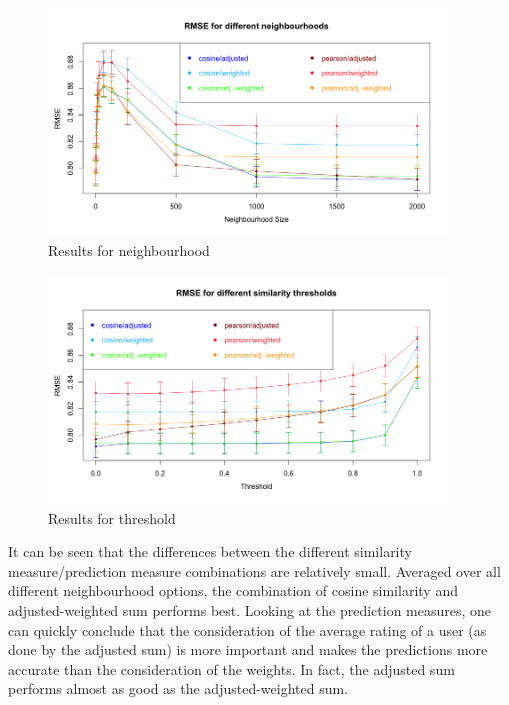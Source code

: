 \begin{figure}[!ht]
\centering
\includegraphics[width=400px]{./4-experiments/figures/USERBASED_N_V4.png}
\caption{Results for neighbourhood}
\label{f:userbasedn}
\end{figure}

\begin{figure}[!ht]
\includegraphics[width=400px]{./4-experiments/figures/USERBASED_T_V4.png}
\caption{Results for threshold}
\label{f:userbasedt}
\end{figure}

It can be seen that the differences between the different similarity measure/prediction measure combinations are relatively small. Averaged over all different neighbourhood options, the combination of cosine similarity and adjusted-weighted sum performs best. Looking at the prediction measures, one can quickly conclude that the consideration of the average rating of a user (as done by the adjusted sum) is more important and makes the predictions more accurate than the consideration of the weights. In fact, the adjusted sum performs almost as good as the adjusted-weighted sum.

